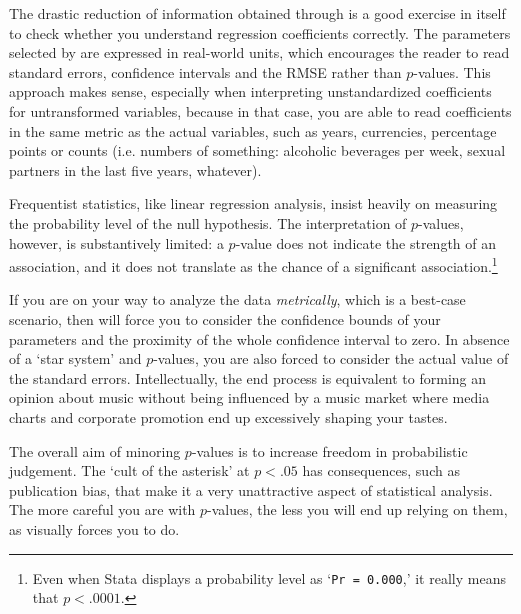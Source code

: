 	The drastic reduction of information obtained through  is a good exercise in itself to check whether you understand regression coefficients correctly. The parameters selected by  are expressed in real-world units, which encourages the reader to read standard errors, confidence intervals and the RMSE rather than $p$-values. This approach makes sense, especially when interpreting unstandardized coefficients for untransformed variables, because in that case, you are able to read coefficients in the same metric as the actual variables, such as years, currencies, percentage points or counts (i.e. numbers of something: alcoholic beverages per week, sexual partners in the last five years, whatever).

	Frequentist statistics, like linear regression analysis, insist heavily on measuring the probability level of the null hypothesis. The interpretation of $p$-values, however, is substantively limited: a $p$-value does not indicate the strength of an association, and it does not translate as the chance of a significant association.\footnote{Even when Stata displays a probability level as `\texttt{Pr = 0.000},' it really means that $p < .0001$.}
	
	If you are on your way to analyze the data \emph{metrically}, which is a best-case scenario, then  will force you to consider the confidence bounds of your parameters and the proximity of the whole confidence interval to zero. In absence of a `star system' and $p$-values, you are also forced to consider the actual value of the standard errors. Intellectually, the end process is equivalent to forming an opinion about music without being influenced by a music market where media charts and corporate promotion end up excessively shaping your tastes.
	
	The overall aim of minoring $p$-values is to increase freedom in probabilistic judgement. The `cult of the asterisk' at $p < .05$ has consequences, such as publication bias, that make it a very unattractive aspect of statistical analysis. The more careful you are with $p$-values, the less you will end up relying on them, as  visually forces you to do.